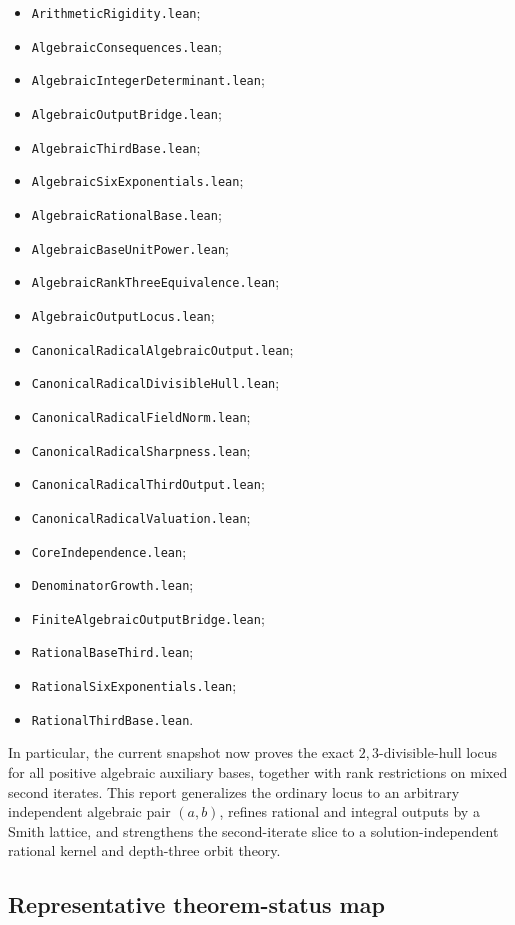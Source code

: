 \documentclass[11pt,oneside]{article}
\theoremstyle{definition}
\theoremstyle{remark}
\begin{document}
\begin{itemize}
\item \texttt{ArithmeticRigidity.lean};
\item \texttt{AlgebraicConsequences.lean};
\item \texttt{AlgebraicIntegerDeterminant.lean};
\item \texttt{AlgebraicOutputBridge.lean};
\item \texttt{AlgebraicThirdBase.lean};
\item \texttt{AlgebraicSixExponentials.lean};
\item \texttt{AlgebraicRationalBase.lean};
\item \texttt{AlgebraicBaseUnitPower.lean};
\item \texttt{AlgebraicRankThreeEquivalence.lean};
\item \texttt{AlgebraicOutputLocus.lean};
\item \texttt{CanonicalRadicalAlgebraicOutput.lean};
\item \texttt{CanonicalRadicalDivisibleHull.lean};
\item \texttt{CanonicalRadicalFieldNorm.lean};
\item \texttt{CanonicalRadicalSharpness.lean};
\item \texttt{CanonicalRadicalThirdOutput.lean};
\item \texttt{CanonicalRadicalValuation.lean};
\item \texttt{CoreIndependence.lean};
\item \texttt{DenominatorGrowth.lean};
\item \texttt{FiniteAlgebraicOutputBridge.lean};
\item \texttt{RationalBaseThird.lean};
\item \texttt{RationalSixExponentials.lean};
\item \texttt{RationalThirdBase.lean}.
\end{itemize}

In particular, the current snapshot now proves the exact $2,3$-divisible-hull locus for all
positive algebraic auxiliary bases, together with rank restrictions on mixed second
iterates.  This report generalizes the ordinary locus to an arbitrary independent algebraic
pair $(a,b)$, refines rational and integral outputs by a Smith lattice, and strengthens the
second-iterate slice to a solution-independent rational kernel and depth-three orbit theory.

\subsection{Representative theorem-status map}
\end{document}
